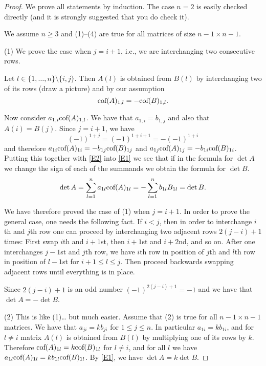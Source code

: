 \begin{proof} 
We prove all statements by induction. The case $n=2$ is easily checked directly (and it is strongly suggested that you do check it). 

We assume $n\geq 3$ and  (1)--(4) are true for all matrices of size $n-1\times n-1$. 

(1) 
We prove the case when $j=i+1$, i.e., we are interchanging two consecutive rows. 

Let $l\in \{1, \dots, n\}\setminus \{i,j\}$. 
Then $A(l)$ is obtained from $B(l)$ by interchanging two of its rows (draw a picture) and 
by our assumption 
\begin{equation} 
\label{E2} 
\mbox{cof}(A)_{1,l}=-\mbox{cof}(B)_{1,l}. 
\end{equation} 

Now consider $a_{1,i} \mbox{cof}(A)_{1,l}$. We have that $a_{1,i}=b_{1,j}$ 
and also that $A(i)=B(j)$. Since $j=i+1$, we have 
\[
(-1)^{1+j}=(-1)^{1+i+1}=-(-1)^{1+i} 
\]
and therefore $a_{1i}\mbox{cof}(A)_{1i}=-b_{1j} \mbox{cof}(B)_{1j}$ and $a_{1j}\mbox{cof}(A)_{1j}=-b_{1i} \mbox{cof}(B)_{1i}$. 
Putting this together with \eqref{E2} into \eqref{E1} we see that if in the formula
for $\det A$ we change the sign of each of the summands we obtain the formula for $\det B$. 
\[
\det A=\sum_{l=1}^n a_{1l}\mbox{cof}(A)_{1l}
=-\sum_{l=1}^n b_{1l} B_{1l}
=\det B. 
\]

We have therefore proved the case of (1) when $j=i+1$. In order to prove the general case, 
one needs the following fact. If $i<j$, then in order to interchange $i$th and $j$th row one 
can proceed by interchanging two adjacent rows $2(j-i)+1$ times: 
First swap $i$th and $i+1$st, then $i+1$st and $i+2$nd, and so on. 
After one interchanges $j-1$st and $j$th row, we have $i$th row in position of $j$th
and $l$th row in position of $l-1$st for $i+1\leq l\leq j$. Then proceed backwards 
swapping adjacent 
rows until everything is in place. 

Since $2(j-i)+1$ is an odd number $(-1)^{2(j-i)+1}=-1$ and 
we have that $\det A=-\det B$. 

(2) This is like (1)\dots{} but much easier. 
Assume that (2) is true for all $n-1\times n-1$ matrices. 
We have that $a_{ji}=k b_{ji}$ for $1\leq j\leq n$. 
In particular $a_{1i}=kb_{1i}$, and for $l\neq i$ matrix 
$A(l)$ is obtained from $B(l)$ by multiplying one of its rows by $k$. 
Therefore $\mbox{cof}(A)_{1l}=k\mbox{cof}(B)_{1l}$ for $l\neq i$, 
and for all $l$ we have $a_{1l} \mbox{cof}(A)_{1l}=k b_{1l}\mbox{cof}(B)_{1l}$. 
By \eqref{E1}, we have $\det A=k\det B$. 


\end{proof}
